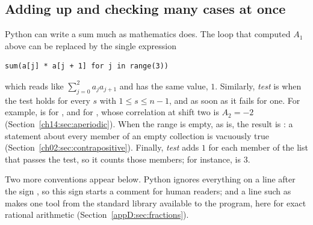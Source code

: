 \subsection*{Adding up and checking many cases at once}
Python can write a sum much as mathematics does. The loop that computed $A_1$ above can be replaced by the single expression
\par\noindent\begin{minipage}{\linewidth}
\begin{lstlisting}
sum(a[j] * a[j + 1] for j in range(3))
\end{lstlisting}
\end{minipage}\par
which reads like $\sum_{j=0}^{2}a_ja_{j+1}$ and has the same value, $1$. Similarly, \emph{test}  is  when the test holds for every $s$ with $1\le s\le n-1$, and  as soon as it fails for one. For example,  is  for , and  for , whose correlation at shift two is $A_2=-2$ (Section~\ref{ch14:sec:aperiodic}). When the range is empty, as  is, the result is : a statement about every member of an empty collection is vacuously true (Section~\ref{ch02:sec:contrapositive}). Finally, \emph{test}\code{)} adds $1$ for each member  of the list  that passes the test, so it counts those members; for instance,  is $3$.

Two more conventions appear below. Python ignores everything on a line after the sign \code{\#}, so this sign starts a comment for human readers; and a line such as  makes one tool from the standard library available to the program, here  for exact rational arithmetic (Section~\ref{appD:sec:fractions}).
